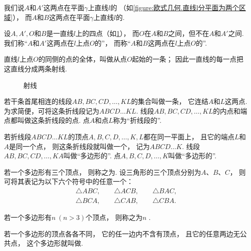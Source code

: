 \begin{definition}
我们说\(A\)和\(A'\)这两点在平面\(\gamma\)上直线\(l\)的%
（如\cref{figure:欧式几何.直线l分平面为两个区域}），
而\(A\)和\(B\)这两点在平面\(\gamma\)上直线\(l\)的.
\end{definition}

\begin{definition}
设\(A,A',O\)和\(B\)是一直线\(l\)上的四点（如\cref{figure:欧式几何.射线}），
而\(O\)在\(A\)和\(B\)之间，但不在\(A\)和\(A'\)之间.
我们称“\(A\)和\(A'\)这两点在\(l\)上点\(O\)的”，
而称“\(A\)和\(B\)这两点在\(l\)上点\(O\)的”.

直线\(l\)上点\(O\)的同侧的点的全体，叫做从点\(O\)起始的一条；
因此一直线的每一点把这直线分成两条射线.
\begin{figure}[ht]
\centering
{}
\caption{射线}
\label{figure:欧式几何.射线}
\end{figure}
\end{definition}

\begin{definition}
若干条首尾相连的线段\(AB,BC,CD,\dotsc,KL\)的集合叫做一条，%
它连结\(A\)和\(L\)这两点.
为求简便，可将这条折线段记为\(ABCD \dotso KL\).
线段\(AB,BC,CD,\dotsc,KL\)的内点和端点都叫做这条折线段的点.
点\(A\)和点\(L\)称为“折线段的”.

若折线段\(ABCD \dotso KL\)的顶点\(A,B,C,D,\dotsc,K,L\)都在同一平面上，%
且它的端点\(L\)和\(A\)是同一个点，%
则这条折线段就叫做一个，%
记为\(ABCD \dotso K\).
线段\(AB,BC,CD,\dotsc,KA\)叫做“多边形的”.
点\(A,B,C,D,\dotsc,K\)叫做“多边形的”.

若一个多边形有三个顶点，%
则称之为.
设三角形的三个顶点分别为\(A\)、\(B\)、\(C\)，%
则可将其表记为以下六个符号中的任意一个：
\[
\begin{split}
\triangle ABC, \qquad
\triangle ACB, \qquad
\triangle BAC, \\
\triangle BCA, \qquad
\triangle CAB, \qquad
\triangle CBA.
\end{split}
\]

若一个多边形有\(n\ (n>3)\)个顶点，%
则称之为\(n\) .

若一个多边形的顶点各各不同，%
它的任一边内不含有顶点，%
且它的任意两边无公共点，%
这个多边形就叫做.
\end{definition}


